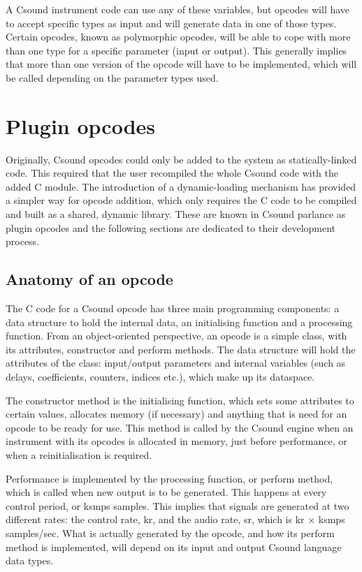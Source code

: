 \documentclass[11pt]{article}
\begin{document}
A Csound instrument code can use any of these variables, but opcodes will have to accept specific types as input and will generate data in one of those types. Certain opcodes, known as polymorphic opcodes, will be able to cope with more than one type for a specific parameter (input or output). This generally implies that more than one version of the opcode will have to be implemented, which will be called depending on the parameter types used.

\section{ Plugin opcodes}

Originally, Csound opcodes could only be added to the system as statically-linked code. This required that the user recompiled the whole Csound code with the added C module. The introduction of a dynamic-loading mechanism has provided a simpler way for opcode addition, which only requires the C code to be compiled and built as a shared, dynamic library. These are known in Csound parlance as plugin opcodes and the following sections are dedicated to their development process.

\subsection{ Anatomy of an opcode}
The C code for a Csound opcode has three main programming components: a data structure to hold the internal data, an initialising function and a processing function. From an object-oriented perspective, an opcode is a simple class, with its attributes, constructor and perform methods. The data structure will hold the attributes of the class: input/output parameters and internal variables (such as delays, coefficients, counters, indices etc.), which make up its dataspace. 

The constructor method is the initialising function, which sets some attributes to certain values, allocates memory (if necessary) and anything that is need for an opcode to be ready for use. This method is called by the Csound engine when an instrument with its opcodes is allocated in memory, just before performance, or when a reinitialisation is required.

Performance is implemented by the processing function, or perform method, which is called when new output is to be generated. This happens at every control period, or ksmps samples. This implies that signals are generated at two different rates: the control rate, kr, and the audio rate, sr, which is kr $\times$ ksmps samples/sec. What is actually generated by the opcode, and how its perform method is implemented, will depend on its input and output Csound language data types.
\end{document}
